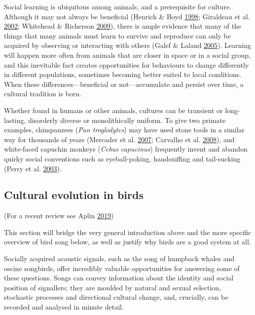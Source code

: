 \documentclass[]{report}
\begin{document}
Social learning is ubiquitous among animals, and a prerequisite for
culture. Although it may not always be beneficial (Henrich \& Boyd
\protect\hyperlink{ref-Henrich1998}{1998}; Giraldeau et al.
\protect\hyperlink{ref-Giraldeau2002}{2002}; Whitehead \& Richerson
\protect\hyperlink{ref-Whitehead2009}{2009}), there is ample evidence
that many of the things that many animals must learn to survive and
reproduce can only be acquired by observing or interacting with others
(Galef \& Laland \protect\hyperlink{ref-Galef2005}{2005}). Learning will
happen more often from animals that are closer in space or in a social
group, and this inevitable fact creates opportunities for behaviours to
change differently in different populations, sometimes becoming better
suited to local conditions. When these differences---beneficial or
not---accumulate and persist over time, a cultural tradition is born.

Whether found in humans or other animals, cultures can be transient or
long-lasting, disorderly diverse or monolithically uniform. To give two
primate examples, chimpanzees (\emph{Pan troglodytes}) may have used
stone tools in a similar way for thousands of years (Mercader et al.
\protect\hyperlink{ref-Mercader2007}{2007}; Carvalho et al.
\protect\hyperlink{ref-Carvalho2008}{2008}), and white-faced capuchin
monkeys (\emph{Cebus capucinus}) frequently invent and abandon quirky
social conventions such as eyeball-poking, handsniffing and tail-sucking
(Perry et al. \protect\hyperlink{ref-Perry2003}{2003}).

\hypertarget{cultural-evolution-in-birds}{%
\subsection{Cultural evolution in
birds}\label{cultural-evolution-in-birds}}

(For a recent review see Aplin \protect\hyperlink{ref-Aplin2018}{2019})

This section will bridge the very general introduction above and the
more specific overview of bird song below, as well as justify why birds
are a good system at all.

Socially acquired acoustic signals, such as the song of humpback whales
and oscine songbirds, offer incredibly valuable opportunities for
answering some of these questions. Songs can convey information about
the identity and social position of signallers; they are moulded by
natural and sexual selection, stochastic processes and directional
cultural change, and, crucially, can be recorded and analysed in minute
detail.
\end{document}
